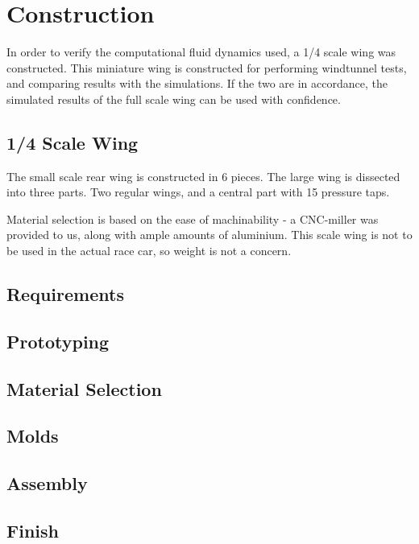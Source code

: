 \chapter{Construction}

In order to verify the computational fluid dynamics used, a 1/4 scale wing was constructed. This miniature wing is constructed for performing windtunnel tests, and comparing results with the simulations. If the two are in accordance, the simulated results of the full scale wing can be used with confidence.

\section{1/4 Scale Wing}

The small scale rear wing is constructed in 6 pieces. The large wing is dissected into three parts. Two regular wings, and a central part with 15 pressure taps.

Material selection is based on the ease of machinability - a CNC-miller was provided to us, along with ample amounts of aluminium. This scale wing is not to be used in the actual race car, so weight is not a concern.

\section{Requirements}




\section{Prototyping}

\section{Material Selection}

\section{Molds}

\section{Assembly}

\section{Finish}
